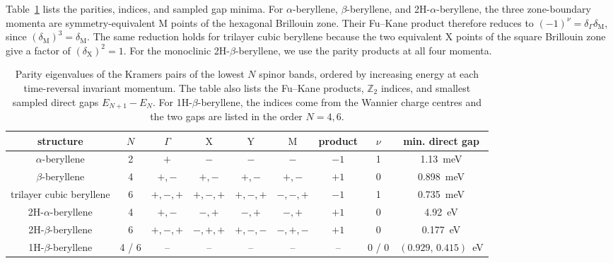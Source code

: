 Table~\ref{tab:proj3_topological_parity} lists the parities, indices, and sampled gap minima.
For $\alpha$-beryllene, $\beta$-beryllene, and 2H-$\alpha$-beryllene, the three zone-boundary momenta are symmetry-equivalent $\mathrm{M}$ points of the hexagonal Brillouin zone.
Their Fu--Kane product therefore reduces to $(-1)^\nu=\delta_\Gamma\delta_\mathrm{M}$, since $(\delta_\mathrm{M})^3=\delta_\mathrm{M}$.
The same reduction holds for trilayer cubic beryllene because the two equivalent $\mathrm{X}$ points of the square Brillouin zone give a factor of $(\delta_\mathrm{X})^2=1$.
For the monoclinic 2H-$\beta$-beryllene, we use the parity products at all four momenta.

\begin{table}[!htbp]
\centering
{}
\setlength{\tabcolsep}{8pt}
\begin{adjustbox}{max width=1.0\linewidth,center}
\begin{tabular}{ccccccccc}
\hline
\rowcolor{gray!25}
structure
& $N$
& $\Gamma$
& $\mathrm{X}$
& $\mathrm{Y}$
& $\mathrm{M}$
& product
& $\nu$
& min. direct gap \\
\hline
$\alpha$-beryllene
& 2
& $+$
& $-$
& $-$
& $-$
& $-1$
& 1
& \qty{1.13}{\milli\electronvolt} \\
$\beta$-beryllene
& 4
& $+, -$
& $+, -$
& $+, -$
& $+, -$
& $+1$
& 0
& \qty{0.898}{\milli\electronvolt} \\
trilayer cubic beryllene
& 6
& $+, -, +$
& $+, -, +$
& $+, -, +$
& $-, -, +$
& $-1$
& 1
& \qty{0.735}{\milli\electronvolt} \\
2H-$\alpha$-beryllene
& 4
& $+, -$
& $-, +$
& $-, +$
& $-, +$
& $+1$
& 0
& \qty{4.92}{\electronvolt} \\
2H-$\beta$-beryllene
& 6
& $+, -, +$
& $-, +, +$
& $+, -, -$
& $-, +, -$
& $+1$
& 0
& \qty{0.177}{\electronvolt} \\
1H-$\beta$-beryllene
& 4 / 6
& --
& --
& --
& --
& --
& 0 / 0
& $(0.929,\,0.415)$~\unit{\electronvolt} \\
\hline
\end{tabular}
\end{adjustbox}
\caption{Parity eigenvalues of the Kramers pairs of the lowest $N$ spinor bands, ordered by increasing energy at each time-reversal invariant momentum.
The table also lists the Fu--Kane products, $\mathbb{Z}_2$ indices, and smallest sampled direct gaps $E_{N+1}-E_N$.
For 1H-$\beta$-beryllene, the indices come from the Wannier charge centres and the two gaps are listed in the order $N=4,6$.}

\label{tab:proj3_topological_parity}
\end{table}

